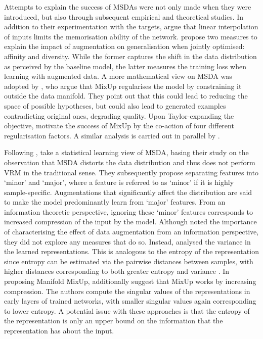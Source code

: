 \documentclass[journal]{IEEEtran}
\newcommand{\mixup}{MixUp\xspace}
\begin{document}
Attempts to explain the success of MSDAs were not only made when they were introduced, but also through subsequent empirical and theoretical studies. 
In addition to their experimentation with the targets, \citet{liang2018understanding} argue that linear interpolation of inputs limits the memorisation ability of the network.
\citet{gontijo2020affinity} propose two measures to explain the impact of augmentation on generalisation when jointly optimised: affinity and diversity.
While the former captures the shift in the data distribution as perceived by the baseline model, the latter measures the training loss when learning with augmented data. A more mathematical view on MSDA was adopted by \citet{guo2019mixup}, who argue that \mixup regularises the model by constraining it outside the data manifold. They point out that this could lead to reducing the space of possible hypotheses, but could also lead to generated examples contradicting original ones, degrading quality.
Upon Taylor-expanding the objective, \citet{carratino2020mixup} motivate the success of \mixup by the co-action of four different regularisation factors. 
A similar analysis is carried out in parallel by \citet{zhang2020does}.

Following \citet{zhang2017mixup}, \citet{he2019data} take a statistical learning view of MSDA, basing their study on the observation that MSDA distorts the data distribution and thus does not perform VRM in the traditional sense. They subsequently propose separating features into `minor' and `major', where a feature is referred to as `minor' if it is highly sample-specific.
Augmentations that significantly affect the distribution are said to make the model predominantly learn from `major' features.
From an information theoretic perspective, ignoring these `minor' features corresponds to increased compression of the input by the model.
Although \citet{he2019data} noted the importance of characterising the effect of data augmentation from an information perspective, they did not explore any measures that do so.
Instead, \citet{he2019data} analysed the variance in the learned representations. This is analogous to the entropy of the representation since entropy can be estimated via the pairwise distances between samples, with higher distances corresponding to both greater entropy and variance \citep{kolchinsky2017estimating}.
In proposing Manifold \mixup, \citet{pmlr-v97-verma19a} additionally suggest that \mixup works by increasing compression. The authors compute the singular values of the representations in early layers of trained networks, with smaller singular values again corresponding to lower entropy. A potential issue with these approaches is that the entropy of the representation is only an upper bound on the information that the representation has about the input.
\end{document}
